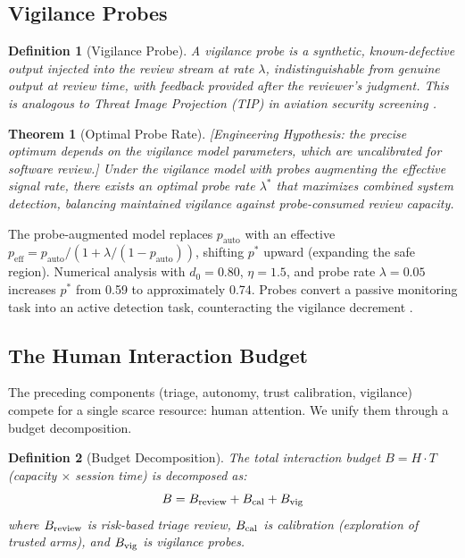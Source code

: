 \documentclass[11pt, a4paper]{googledeepmind}
\newtheorem{definition}{Definition}[section]
\newtheorem{theorem}{Theorem}[section]
\begin{document}
\subsection{Vigilance Probes}

\begin{definition}[Vigilance Probe]
A vigilance probe is a synthetic, known-defective output injected into the review stream at rate $\lambda$, indistinguishable from genuine output at review time, with feedback provided after the reviewer's judgment. This is analogous to Threat Image Projection (TIP) in aviation security screening \citep{wolfe2005low}.
\end{definition}

\begin{theorem}[Optimal Probe Rate]
\emph{[Engineering Hypothesis: the precise optimum depends on the vigilance model parameters, which are uncalibrated for software review.]}
\label{thm:probe-rate}
Under the vigilance model with probes augmenting the effective signal rate, there exists an optimal probe rate $\lambda^*$ that maximizes combined system detection, balancing maintained vigilance against probe-consumed review capacity.
\end{theorem}

The probe-augmented model replaces $p_{\text{auto}}$ with an effective $p_{\text{eff}} = p_{\text{auto}} / (1 + \lambda/(1-p_{\text{auto}}))$, shifting $p^*$ upward (expanding the safe region). Numerical analysis with $d_0 = 0.80$, $\eta = 1.5$, and probe rate $\lambda = 0.05$ increases $p^*$ from 0.59 to approximately 0.74. Probes convert a passive monitoring task into an active detection task, counteracting the vigilance decrement \citep{warm2008vigilance}.

\subsection{The Human Interaction Budget}

The preceding components (triage, autonomy, trust calibration, vigilance) compete for a single scarce resource: human attention. We unify them through a budget decomposition.

\begin{definition}[Budget Decomposition]
\label{def:budget}
The total interaction budget $B = H \cdot T$ (capacity $\times$ session time) is decomposed as:
\begin{equation}
B = B_{\textup{review}} + B_{\textup{cal}} + B_{\textup{vig}}
\end{equation}
where $B_{\textup{review}}$ is risk-based triage review, $B_{\textup{cal}}$ is calibration (exploration of trusted arms), and $B_{\textup{vig}}$ is vigilance probes.
\end{definition}
\end{document}
